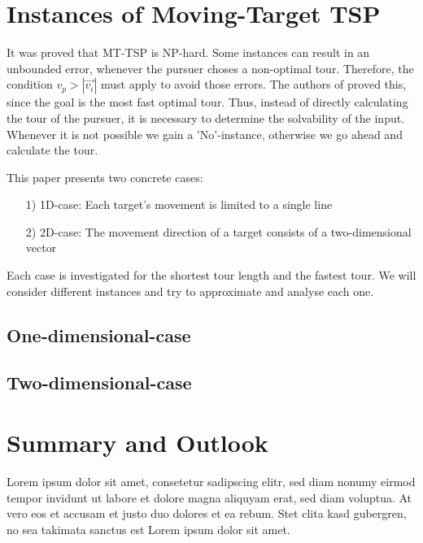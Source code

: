 \documentclass{acm_proc_article-sp}
\begin{document}
\section{Instances of Moving-Target TSP}

It was proved that MT-TSP is NP-hard. Some instances can result in an unbounded error, whenever the pursuer choses a non-optimal tour. Therefore, the condition $v_p > |\overrightarrow{v_i}|$ must apply to avoid those errors. The authors of \cite{helvig2003moving} proved this, since the goal is the most fast optimal tour.  Thus, instead of directly calculating the tour of the pursuer, it is necessary to determine the solvability of the input. Whenever it is not possible we gain a 'No'-instance, otherwise we go ahead and calculate the tour. 

This paper presents two concrete cases:

\begin{itemize}
\item[1)]
1D-case: 
Each target's movement is limited to a single line 

\item[2)]
2D-case:
The movement direction of a target consists of a two-dimensional vector 

\end{itemize}

Each case is investigated for the shortest tour length and the fastest tour. We will consider different instances and try to approximate and analyse each one. 


\subsection{One-dimensional-case}



\subsection{Two-dimensional-case}


\section{Summary and Outlook}
Lorem ipsum dolor sit amet, consetetur sadipscing elitr, sed diam nonumy eirmod tempor invidunt ut labore et dolore magna aliquyam erat, sed diam voluptua. At vero eos et accusam et justo duo dolores et ea rebum. Stet clita kasd gubergren, no sea takimata sanctus est Lorem ipsum dolor sit amet.

{}

\end{document}
